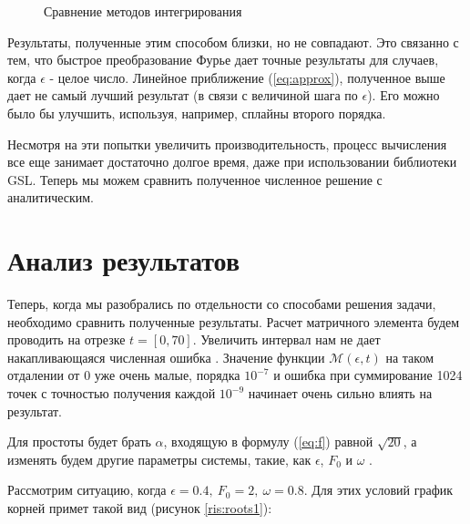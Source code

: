 \documentclass[14pt, a4paper]{article}
\numberwithin{figure}{section}
\numberwithin{equation}{section}
\newcommand{\sectionbreak}{\clearpage}
\newcommand{\cM}{\mathcal{M}}
\begin{document}
\begin{figure}[h]
	\caption{Сравнение методов интегрирования}
	\label{ris:fftw_compare_no_fftw2}
\end{figure}

Результаты, полученные этим способом близки, но не совпадают. Это связанно с тем, что быстрое преобразование Фурье дает точные результаты для случаев, когда $\epsilon$ - целое число. Линейное приближение (\ref{eq:approx}), полученное выше дает не самый лучший результат (в связи с величиной шага по $\epsilon$). Его можно было бы улучшить, используя, например, сплайны второго порядка.

Несмотря на эти попытки увеличить производительность, процесс вычисления все еще занимает достаточно долгое время, даже при использовании библиотеки GSL.
Теперь мы можем сравнить полученное численное решение с аналитическим.

\sectionbreak
\section{Анализ результатов}
Теперь, когда мы разобрались по отдельности со способами решения задачи, необходимо сравнить полученные результаты.
Расчет матричного элемента будем проводить на отрезке $t = [0, 70]$. Увеличить интервал нам не дает накапливающаяся численная ошибка . Значение функции $\cM(\epsilon, t)$ на таком отдалении от 0 уже очень малые, порядка $10^{-7}$ и ошибка при суммирование 1024 точек с точностью получения каждой $10^{-9}$ начинает очень сильно влиять на результат.

Для простоты будет брать $\alpha$, входящую в формулу (\ref{eq:f}) равной $\sqrt{20}$, а изменять будем другие параметры системы, такие, как $\epsilon$, $F_0$ и $\omega$ .

Рассмотрим ситуацию, когда $\epsilon = 0.4,\ F_0 = 2,\ \omega = 0.8$. Для этих условий график корней примет такой вид (рисунок \ref{ris:roots1}):
\end{document}
